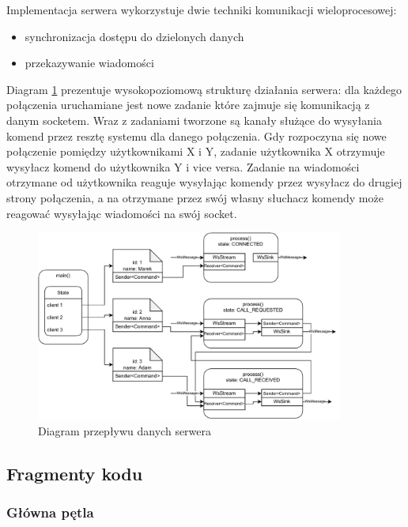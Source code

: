 Implementacja serwera wykorzystuje dwie techniki komunikacji wieloprocesowej:

\begin{itemize}
    \item synchronizacja dostępu do dzielonych danych
    \item przekazywanie wiadomości
\end{itemize}

Diagram \ref{fig:server_data_flow} prezentuje wysokopoziomową strukturę działania serwera: dla
każdego połączenia uruchamiane jest nowe zadanie które zajmuje się komunikacją z danym socketem.
Wraz z zadaniami tworzone są kanały służące do wysyłania komend przez resztę systemu dla danego
połączenia. Gdy rozpoczyna się nowe połączenie pomiędzy użytkownikami X i Y, zadanie użytkownika X
otrzymuje wysyłacz komend do użytkownika Y i vice versa. Zadanie na wiadomości otrzymane od
użytkownika reaguje wysyłając komendy przez wysyłacz do drugiej strony połączenia, a na otrzymane
przez swój własny słuchacz komendy może reagować wysyłając wiadomości na swój socket.

\begin{figure}[H]
    \centering
    \includegraphics[width=0.9\textwidth]{img/implementacja/server_data_flow}
    \caption{Diagram przepływu danych serwera}
    \label{fig:server_data_flow}
\end{figure}

\subsection{Fragmenty kodu}

\subsubsection{Główna pętla}


